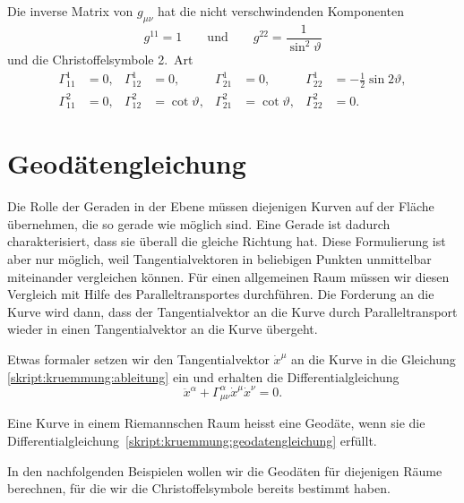 Die inverse Matrix von $g_{\mu\nu}$ hat die nicht verschwindenden
Komponenten
\[
g^{11} = 1
\qquad\text{und}\qquad
g^{22} = \frac1{\sin^2\vartheta}
\]
und die Christoffelsymbole 2.~Art
\begin{equation}
\begin{aligned}
 \Gamma_{11}^1
&=0,
&\Gamma_{12}^1
&=0,
&\Gamma_{21}^1
&=0,
&\Gamma_{22}^1
&=-\frac12\sin2\vartheta,
\\
 \Gamma_{11}^2
&=0,
&\Gamma_{12}^2
&=\cot\vartheta,
&\Gamma_{21}^2
&=\cot\vartheta,
&\Gamma_{22}^2
&=0.
\end{aligned}
\label{skript:kruemmung:christoffelkugel}
\end{equation}


\section{Geodätengleichung}
Die Rolle der Geraden in der Ebene müssen diejenigen Kurven auf der
Fläche übernehmen, die so gerade wie möglich sind. 
Eine Gerade ist dadurch charakterisiert, dass sie überall die gleiche
Richtung hat. 
Diese Formulierung ist aber nur möglich, weil Tangentialvektoren in
beliebigen Punkten unmittelbar miteinander vergleichen können.
Für einen allgemeinen Raum müssen wir diesen Vergleich mit Hilfe
des Paralleltransportes durchführen.
Die Forderung an die Kurve wird dann, dass der Tangentialvektor
an die Kurve durch Paralleltransport wieder in einen Tangentialvektor
an die Kurve übergeht.

Etwas formaler setzen wir den Tangentialvektor $\dot x^\mu$ an die
Kurve in die Gleichung \eqref{skript:kruemmung:ableitung} ein und
erhalten die Differentialgleichung 
\begin{equation}
\ddot x^\alpha+\Gamma_{\mu\nu}^\alpha \dot x^\mu\dot x^\nu=0.
\label{skript:kruemmung:geodatengleichung}
\end{equation}

\begin{definition}
Eine Kurve in einem Riemannschen Raum heisst eine Geodäte, wenn sie
die Differentialgleichung~\eqref{skript:kruemmung:geodatengleichung}
erfüllt.
\end{definition}

In den nachfolgenden Beispielen wollen wir die Geodäten für diejenigen
Räume berechnen, für die wir die Christoffelsymbole bereits bestimmt
haben.

%
%

